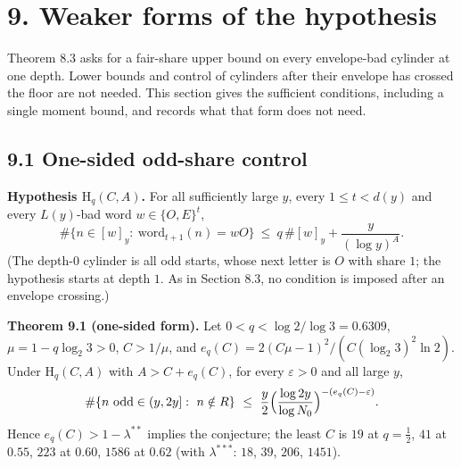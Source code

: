 \documentclass[11pt,a4paper]{article}
\begin{document}
\section{9. Weaker forms of the
hypothesis}\label{weaker-forms-of-the-hypothesis}

Theorem 8.3 asks for a fair-share upper bound on every envelope-bad
cylinder at one depth. Lower bounds and control of cylinders after their
envelope has crossed the floor are not needed. This section gives the
sufficient conditions, including a single moment bound, and records what
that form does not need.

\subsection{9.1 One-sided odd-share
control}\label{one-sided-odd-share-control}

\textbf{Hypothesis \(\mathrm H_q(C,A)\).} For all sufficiently large
\(y\), every \(1\le t<d(y)\) and every \(L(y)\)-bad word
\(w\in\{O,E\}^t\), \[
\#\{n\in[w]_y:\ \mathrm{word}_{t+1}(n)=wO\}\ \le\ q\,\#[w]_y+\frac{y}{(\log y)^{A}} .
\] (The depth-\(0\) cylinder is all odd starts, whose next letter is
\(O\) with share \(1\); the hypothesis starts at depth \(1\). As in
Section 8.3, no condition is imposed after an envelope crossing.)

\textbf{Theorem 9.1 (one-sided form).} Let \(0<q<\log 2/\log 3=0.6309\),
\(\mu=1-q\log_2 3>0\), \(C>1/\mu\), and
\(e_q(C)=2(C\mu-1)^2/(C(\log_2 3)^2\ln 2)\). Under \(\mathrm H_q(C,A)\)
with \(A>C+e_q(C)\), for every \(\varepsilon>0\) and all large \(y\), \[
\#\{n\ \text{odd}\in(y,2y]:\ n\notin R\}\ \le\ \frac y2\Bigl(\frac{\log 2y}{\log N_0}\Bigr)^{-(e_q(C)-\varepsilon)} .
\] Hence \(e_q(C)>1-\lambda^{**}\) implies the conjecture; the least
\(C\) is \(19\) at \(q=\tfrac12\), \(41\) at \(0.55\), \(223\) at
\(0.60\), \(1586\) at \(0.62\) (with \(\lambda^{***}\): \(18\), \(39\),
\(206\), \(1451\)).
\end{document}
